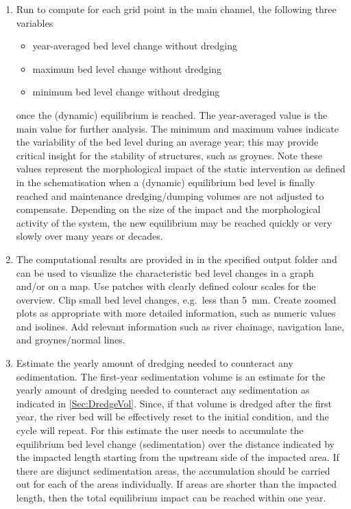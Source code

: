 \begin{enumerate}
\item Run \dfastmi to compute for each grid point in the main channel, the following three variables

\begin{itemize}
\item year-averaged bed level change  without dredging
\item maximum bed level change  without dredging
\item minimum bed level change  without dredging
\end{itemize}

once the (dynamic) equilibrium is reached. The year-averaged value is the main value for further analysis.
The minimum and maximum values indicate the variability of the bed level during an average year; this may provide critical insight for the stability of structures, such as groynes.
Note these values represent the morphological impact of the static intervention as defined in the \dflowfm schematisation when a (dynamic) equilibrium bed level is finally reached and maintenance dredging/dumping volumes are not adjusted to compensate.
Depending on the size of the impact and the morphological activity of the system, the new equilibrium may be reached quickly or very slowly over many years or decades.

\item The computational results are provided in  in the specified output folder and can be used to visualize the characteristic bed level changes in a graph and/or on a map.
Use patches with clearly defined colour scales for the overview.
Clip small bed level changes, e.g.~less than \SI{5}{\milli\metre}.
Create zoomed plots as appropriate with more detailed information, such as numeric values and isolines.
Add relevant information such as river chainage, navigation lane, and groynes/normal lines.

\item Estimate the yearly amount of dredging needed to counteract any sedimentation.
The first-year sedimentation volume is an estimate for the yearly amount of dredging needed to counteract any sedimentation as indicated in \autoref{Sec:DredgeVol}.
Since, if that volume is dredged after the first year, the river bed will be effectively reset to the initial condition, and the cycle will repeat.
For this estimate the user needs to accumulate the equilibrium bed level change (sedimentation) over the distance indicated by the impacted length starting from the upstream side of the impacted area.
If there are disjunct sedimentation areas, the accumulation should be carried out for each of the areas individually.
If areas are shorter than the impacted length, then the total equilibrium impact can be reached within one year.
\end{enumerate}

